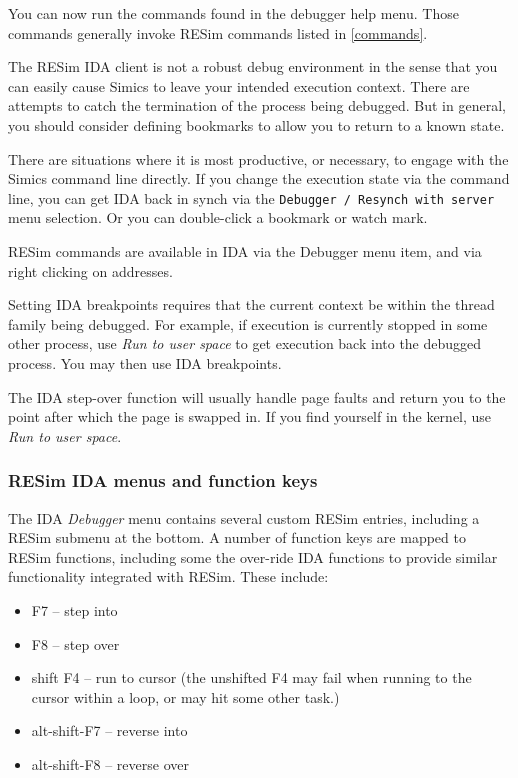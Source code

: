 \documentclass[titlepage]{article}
\begin{document}
You can now run the commands found in the debugger help menu.  Those commands generally invoke RESim commands listed in \ref{commands}.

The RESim IDA client is not a robust debug environment in the sense that you can easily cause Simics to leave your intended execution context.
There are attempts to catch the termination of the process being debugged.  But in general, you should consider defining bookmarks to allow you to
return to a known state.  

There are situations where it is most productive, or necessary, to engage with the Simics command line directly.  If you change the execution state
via the command line, you can get IDA back in synch via the {\tt Debugger / Resynch with server} menu selection.  Or you can double-click a bookmark
or watch mark.

RESim commands are available in IDA via the Debugger menu item, and via right clicking on addresses.  

Setting IDA breakpoints requires that the current context be within the thread family being debugged.  For example, if execution is currently 
stopped in some other process, use \textit{Run to user space} to get execution back into the debugged process.  You may then use IDA breakpoints.

The IDA step-over function will usually handle page faults and return you to the point after which the page is swapped in.  If you find yourself in
the kernel, use \textit{Run to user space}.

\subsubsection{RESim IDA menus and function keys}
The IDA \textit{Debugger} menu contains several custom RESim entries, including a RESim submenu at the bottom.
A number of function keys are mapped to RESim functions, including some the over-ride IDA functions to provide similar functionality integrated with RESim.  
These include:
\begin{itemize}
\item F7 -- step into
\item F8 -- step over
\item shift F4 -- run to cursor (the unshifted F4 may fail when running to the cursor within a loop, or may hit some other task.)
\item alt-shift-F7 -- reverse into
\item alt-shift-F8 -- reverse over
\end{itemize}
\end{document}
